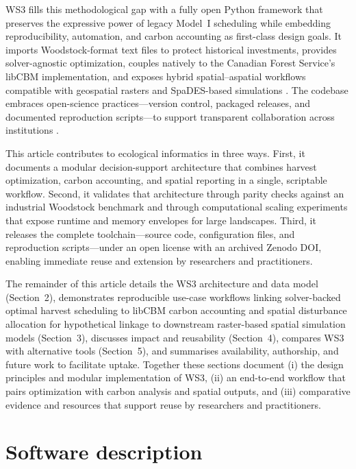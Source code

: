 \documentclass[review]{elsarticle}
\begin{document}
WS3 fills this methodological gap with a fully open Python framework that preserves the expressive power of legacy Model~I scheduling while embedding reproducibility, automation, and carbon accounting as first-class design goals. It imports Woodstock-format text files to protect historical investments, provides solver-agnostic optimization, couples natively to the Canadian Forest Service’s libCBM implementation, and exposes hybrid spatial–aspatial workflows compatible with geospatial rasters and SpaDES-based simulations \citep{remsoft-woodstock, pulp, highs, gurobi, kurz2009cbm, libcbm_py, spades}. The codebase embraces open-science practices—version control, packaged releases, and documented reproduction scripts—to support transparent collaboration across institutions \citep{hampton2015tao, lowndes2017path}.

This article contributes to ecological informatics in three ways. First, it documents a modular decision-support architecture that combines harvest optimization, carbon accounting, and spatial reporting in a single, scriptable workflow. Second, it validates that architecture through parity checks against an industrial Woodstock benchmark and through computational scaling experiments that expose runtime and memory envelopes for large landscapes. Third, it releases the complete toolchain—source code, configuration files, and reproduction scripts—under an open license with an archived Zenodo DOI, enabling immediate reuse and extension by researchers and practitioners.

The remainder of this article details the WS3 architecture and data model (Section~2), demonstrates reproducible use-case workflows linking solver-backed optimal harvest scheduling to libCBM carbon accounting and spatial disturbance allocation for hypothetical linkage to downstream raster-based spatial simulation models (Section~3), discusses impact and reusability (Section~4), compares WS3 with alternative tools (Section~5), and summarises availability, authorship, and future work to facilitate uptake. Together these sections document (i) the design principles and modular implementation of WS3, (ii) an end-to-end workflow that pairs optimization with carbon analysis and spatial outputs, and (iii) comparative evidence and resources that support reuse by researchers and practitioners.

\section{Software description}
\end{document}
